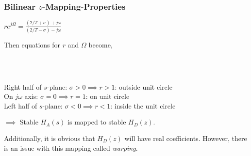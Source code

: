 \documentclass[mathserif, 10pt]{beamer} %
\begin{document}
\frame
{
\normalsize
\frametitle{Bilinear $z$-Mapping-Properties}


$re^{j\Omega} = \frac{(2/T+\sigma)+j\omega}{(2/T-\sigma)-j\omega}$\\ \vspace{.05in}

Then equations for $r$ and $\Omega$ become, \\ \vspace{.05in}

\\ \vspace{.05in}
\\ \vspace{.1in}

Right half of $s$-plane:  $\sigma>0 \implies r>1$:  outside unit circle\\ \vspace{.05in}
On $j\omega$ axis:  $\sigma = 0 \implies r=1$: on unit circle\\ \vspace{.05in}
Left half of $s$-plane:  $\sigma<0 \implies r<1$: inside the unit circle\\ \vspace{.1in}

$\implies$ Stable $H_A(s)$ is mapped to stable $H_D(z)$.\\ \vspace{.05in}

Additionally, it is obvious that $H_D(z)$ will have real coefficients. However, there is an issue
with this mapping called \textit{warping}. \\


}
\end{document}
